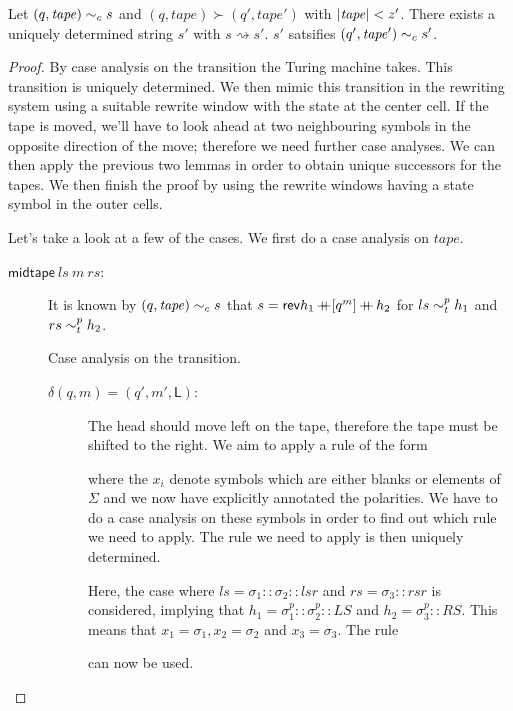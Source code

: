 \documentclass[a4paper,UKenglish,cleveref, autoref]{lipics-v2019}
\newcommand{\strent}{\rightsquigarrow}
\begin{document}
\begin{lemma}\label{lem:simstep}
  Let $(q, \mathit{tape}) \sim_c{} s$ and $(q, \mathit{tape}) \succ (q', \mathit{tape}')$ with $|\mathit{tape}| < z'$. There exists a uniquely determined string $s'$ with $s \strent{} s'$. $s'$ satsifies $(q', \mathit{tape}') \sim_c{} s'$. 
\end{lemma}
\begin{proof}
  By case analysis on the transition the Turing machine takes. This transition is uniquely determined. We then mimic this transition in the rewriting system using a suitable rewrite window with the state at the center cell. If the tape is moved, we'll have to look ahead at two neighbouring symbols in the opposite direction of the move; therefore we need further case analyses. We can then apply the previous two lemmas in order to obtain unique successors for the tapes. 
  We then finish the proof by using the rewrite windows having a state symbol in the outer cells. 

  Let's take a look at a few of the cases.
  We first do a case analysis on $\mathit{tape}$.
  \begin{description}
    \item[$\textsf{midtape}~ls~m~rs$:]
      It is known by $(q, \mathit{tape}) \sim_c{} s$ that $s = \mathsf{rev}{h_1} \mathop{{+}\!\!\!{+}} [q^m] \mathop{{+}\!\!\!{+}} h_2$ for $ls \sim_t^{p} h_1$ and $rs \sim_t^{p} h_2$.

      Case analysis on the transition.
      \begin{description}
        \item[$\delta(q, m) = (q', m', \textsf{L})$:]
          The head should move left on the tape, therefore the tape must be shifted to the right. We aim to apply a rule of the form
          \begin{center}
          \end{center}
          where the $x_i$ denote symbols which are either blanks or elements of $\Sigma$ and we now have explicitly annotated the polarities. We have to do a case analysis on these symbols in order to find out which rule we need to apply. 
          The rule we need to apply is then uniquely determined. 

          Here, the case where $ls = \sigma_1 :: \sigma_2 :: lsr$ and $rs = \sigma_3 :: rsr$ is considered, implying that $h_1 = \sigma_1^p :: \sigma_2^p :: LS$ and $h_2 = \sigma_3^p :: RS$. 
          This means that $x_1 = \sigma_1, x_2 = \sigma_2$ and $x_3 = \sigma_3$. The rule 
          \begin{center}
          \end{center}
          can now be used.


\end{description}
\end{description}
\end{proof}
\end{document}
